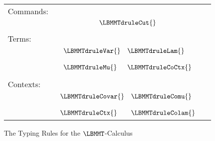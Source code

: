\begin{figure}
  \begin{center}
    \begin{tabular}{lcc}
      Commands:\\
      &
      \begin{math}
        \LBMMTdruleCut{}
      \end{math}\\     
      & \\
      Terms:\\
      &
        \begin{math}
          \begin{array}{lll}
            \LBMMTdruleVar{} & \LBMMTdruleLam{}\\
            &\\
            \LBMMTdruleMu{} & \LBMMTdruleCoCtx{}
          \end{array}
        \end{math}\\
      &\\
      Contexts:\\
      &
        \begin{math}
          \begin{array}{lll}
            \LBMMTdruleCovar{} & \LBMMTdruleComu{}\\
            &\\
            \LBMMTdruleCtx{} & \LBMMTdruleColam{}
          \end{array}
        \end{math}
    \end{tabular}
  \end{center}
  \caption{The Typing Rules for the $\LBMMT$-Calculus}
  \label{fig:lbmmt_typing}
\end{figure}

